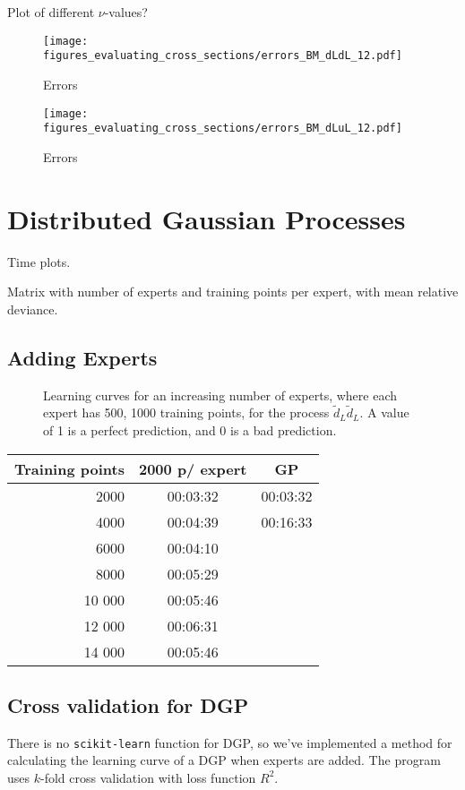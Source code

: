 \documentclass[twoside,english]{uiofysmaster}
\begin{document}
Plot of different $\nu$-values?


\begin{figure}
\texttt{[image: figures\_evaluating\_cross\_sections/errors\_BM\_dLdL\_12.pdf]}
\caption{Errors}
\label{Fig:: evaluating cross : errors BM dLdL}
\end{figure}

\begin{figure}
\texttt{[image: figures\_evaluating\_cross\_sections/errors\_BM\_dLuL\_12.pdf]}
\caption{Errors}
\label{Fig:: evaluating cross : errors BM dLuL}
\end{figure}







\section{Distributed Gaussian Processes}

Time plots.

Matrix with number of experts and training points per expert, with mean relative deviance.

\subsection{Adding Experts}

\begin{figure}[H]
\caption{Learning curves for an increasing number of experts, where each expert has 500, 1000 training points, for the process $\tilde{d}_L \tilde{d}_L$. A value of 1 is a perfect prediction, and 0 is a bad prediction.}
\end{figure}

\begin{table}
\centering
\begin{tabular}{r|c|c}
Training points & 2000 p/ expert & GP\\
\hline
2000 & 00:03:32 & 00:03:32\\
4000 & 00:04:39 & 00:16:33\\
6000 & 00:04:10\\
8000 & 00:05:29\\
10 000 & 00:05:46\\
12 000 & 00:06:31\\
14 000 & 00:05:46\\
\end{tabular}
\end{table}

\subsection{Cross validation for DGP}

There is no \verb|scikit-learn| function for DGP, so we've implemented a method for calculating the learning curve of a DGP when experts are added. The program uses $k$-fold cross validation with loss function $R^2$.




\end{document}
